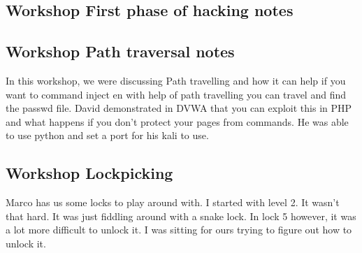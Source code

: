 \documentclass[12pt, letterpaper]{article}
\begin{document}
\newpage
\subsection{Workshop First phase of hacking notes}
\label{workshop:week2}
\newpage



\newpage
\subsection{Workshop Path traversal notes}
\label{workshop:path_traversal}
In this workshop, we were discussing Path travelling and how it can help if you want to command inject en with help of path travelling you can travel and find the passwd file. David demonstrated in DVWA that you can exploit this in PHP and what happens if you don't protect your pages from commands. He was able to use python and set a port for his kali to use.

\subsection{Workshop Lockpicking}
\label{workshop:week2Lockpicking}
Marco has us some locks to play around with. I started with level 2. It wasn't that hard. It was just fiddling around with a snake lock. In lock 5 however, it was a lot more difficult to unlock it. I was sitting for ours trying to figure out how to unlock it.
\hfill\break
\end{document}
